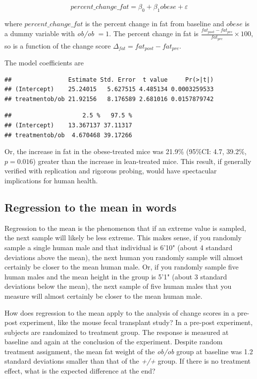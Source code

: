 \documentclass[]{book}
\begin{document}
\begin{equation}
percent\_change\_fat = \beta_0 + \beta_1 obese + \varepsilon
\end{equation}

where \(percent\_change\_fat\) is the percent change in fat from baseline and \(obese\) is a dummy variable with \emph{ob/ob} \(= 1\). The percent change in fat is \(\frac{fat_{post} - fat_{pre}}{fat_{pre}} \times 100\), so is a function of the change score \(\Delta_{fat} = fat_{post} - fat_{pre}\).

The model coefficients are

\begin{verbatim}
##                Estimate Std. Error  t value     Pr(>|t|)
## (Intercept)    25.24015   5.627515 4.485134 0.0003259533
## treatmentob/ob 21.92156   8.176589 2.681016 0.0157879742
\end{verbatim}

\begin{verbatim}
##                    2.5 %   97.5 %
## (Intercept)    13.367137 37.11317
## treatmentob/ob  4.670468 39.17266
\end{verbatim}

Or, the increase in fat in the obese-treated mice was 21.9\% (95\%CI: 4.7, 39.2\%, \(p=0.016\)) greater than the increase in lean-treated mice. This result, if generally verified with replication and rigorous probing, would have spectacular implications for human health.

\hypertarget{regression-to-the-mean-in-words}{%
\subsection{Regression to the mean in words}\label{regression-to-the-mean-in-words}}

Regression to the mean is the phenomenon that if an extreme value is sampled, the next sample will likely be less extreme. This makes sense, if you randomly sample a single human male and that individual is 6'10" (about 4 standard deviations above the mean), the next human you randomly sample will almost certainly be closer to the mean human male. Or, if you randomly sample five human males and the mean height in the group is 5'1" (about 3 standard deviations below the mean), the next sample of five human males that you measure will almost certainly be closer to the mean human male.

How does regression to the mean apply to the analysis of change scores in a pre-post experiment, like the mouse fecal transplant study? In a pre-post experiment, subjects are randomized to treatment group. The response is measured at baseline and again at the conclusion of the experiment. Despite random treatment assignment, the mean fat weight of the \emph{ob/ob} group at baseline was 1.2 standard deviations smaller than that of the \emph{+/+} group. If there is no treatment effect, what is the expected difference at the end?
\end{document}
